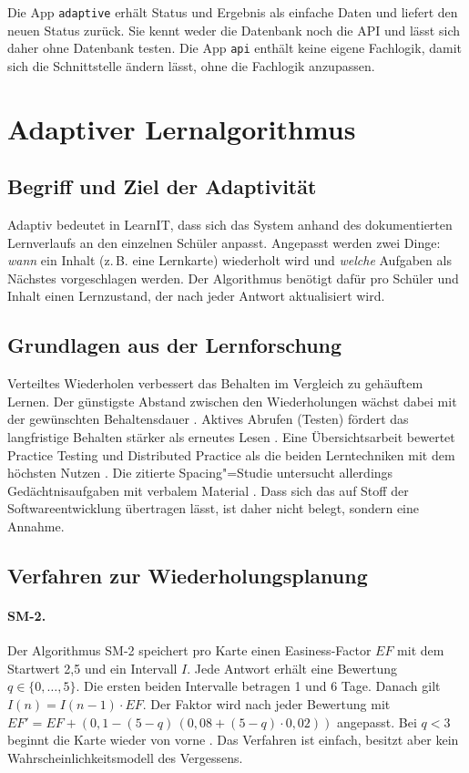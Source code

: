 Die App \texttt{adaptive} erhält Status und Ergebnis als einfache Daten und liefert den neuen Status zurück. Sie kennt weder die Datenbank noch die API und lässt sich daher ohne Datenbank testen. Die App \texttt{api} enthält keine eigene Fachlogik, damit sich die Schnittstelle ändern lässt, ohne die Fachlogik anzupassen.

\section{Adaptiver Lernalgorithmus}
\label{sec:algorithmus}

\subsection{Begriff und Ziel der Adaptivität}
Adaptiv bedeutet in LearnIT, dass sich das System anhand des dokumentierten
Lernverlaufs an den einzelnen Schüler anpasst. Angepasst werden zwei Dinge:
\emph{wann} ein Inhalt (z.\,B. eine Lernkarte) wiederholt wird und \emph{welche}
Aufgaben als Nächstes vorgeschlagen werden. Der Algorithmus benötigt dafür pro
Schüler und Inhalt einen Lernzustand, der nach jeder Antwort aktualisiert wird.

\subsection{Grundlagen aus der Lernforschung}
\label{subsec:lernforschung}
Verteiltes Wiederholen verbessert das Behalten im Vergleich zu gehäuftem Lernen. Der günstigste Abstand zwischen den Wiederholungen wächst dabei mit der gewünschten Behaltensdauer \parencite{cepeda2006}.
Aktives Abrufen (Testen) fördert das langfristige Behalten stärker als erneutes Lesen \parencite{roediger2006}.
Eine Übersichtsarbeit bewertet Practice Testing und Distributed Practice als die beiden Lerntechniken mit dem höchsten Nutzen \parencite{dunlosky2013}.
Die zitierte Spacing"=Studie untersucht allerdings Gedächtnisaufgaben mit verbalem Material \parencite{cepeda2006}. Dass sich das auf Stoff der Softwareentwicklung übertragen lässt, ist daher nicht belegt, sondern eine Annahme.

\subsection{Verfahren zur Wiederholungsplanung}
\paragraph{SM-2.} Der Algorithmus SM-2 speichert pro Karte einen Easiness-Factor $EF$ mit dem Startwert 2{,}5 und ein Intervall $I$. Jede Antwort erhält eine Bewertung $q \in \{0,\dots,5\}$.
Die ersten beiden Intervalle betragen 1 und 6 Tage. Danach gilt $I(n) = I(n-1) \cdot EF$.
Der Faktor wird nach jeder Bewertung mit $EF' = EF + (0{,}1 - (5-q)\,(0{,}08 + (5-q)\cdot 0{,}02))$ angepasst.
Bei $q < 3$ beginnt die Karte wieder von vorne \parencite{wozniak1990}.
Das Verfahren ist einfach, besitzt aber kein Wahrscheinlichkeitsmodell des Vergessens.

